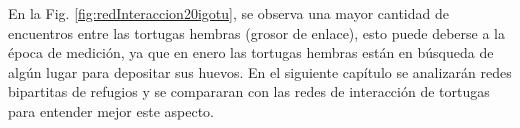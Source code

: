 En la Fig. \ref{fig:redInteraccion20igotu}, se observa una mayor cantidad de encuentros entre las tortugas hembras (grosor de enlace), esto puede deberse a la época de medición, ya que en enero las tortugas hembras están en búsqueda de algún lugar para depositar sus huevos. En el siguiente capítulo se analizarán redes bipartitas de refugios y se compararan con las redes de interacción de tortugas para entender mejor este aspecto.
 
 
 
 

